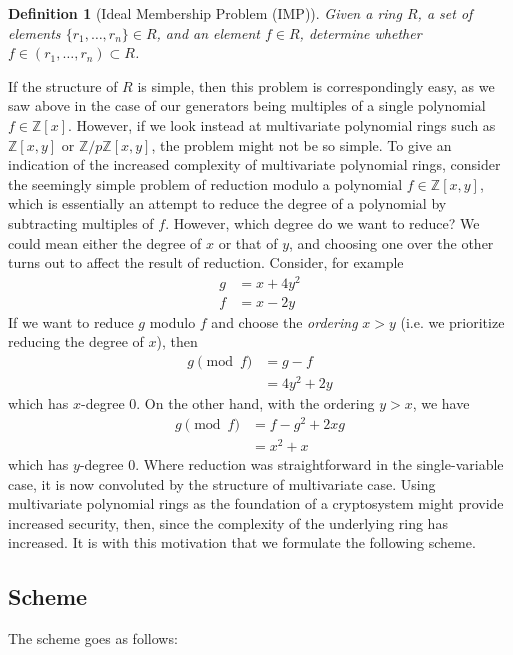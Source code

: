 \documentclass[11pt]{report}
\newtheorem{definition}{Definition}
\newcommand{\Zx}{\mathbb{Z}[x]}
\newcommand{\Zxy}{\mathbb{Z}[x,y]}
\newcommand{\Zpxy}{\mathbb{Z}/p\mathbb{Z}[x,y]}
\begin{document}
\begin{definition}[Ideal Membership Problem (IMP)]
Given a ring $R$, a set of elements $\{r_1,\dots,r_n\}\in R$, and an element $f\in R$, determine whether $f\in (r_1,\dots,r_n) \subset R$.
\end{definition}

If the structure of $R$ is simple, then this problem is correspondingly easy, as we saw above in the case of our generators being multiples of a single polynomial $f\in \Zx$. However, if we look instead at multivariate polynomial rings such as $\Zxy$ or $\Zpxy$, the problem might not be so simple. To give an indication of the increased complexity of multivariate polynomial rings, consider the seemingly simple problem of reduction modulo a polynomial $f\in \Zxy$, which is essentially an attempt to reduce the degree of a polynomial by subtracting multiples of $f$. However, which degree do we want to reduce? We could mean either the degree of $x$ or that of $y$, and choosing one over the other turns out to affect the result of reduction. Consider, for example
\begin{align*}
g &= x+4y^2\\
f &= x-2y
\end{align*}
If we want to reduce $g$ modulo $f$ and choose the \emph{ordering} $x>y$ (i.e. we prioritize reducing the degree of $x$), then
\begin{align*}
g\pmod{f} &= g-f\\
&= 4y^2+2y
\end{align*}
which has $x$-degree $0$. On the other hand, with the ordering $y>x$, we have
\begin{align*}
g\pmod{f} &= f-g^2+2xg\\
&= x^2+x
\end{align*}
which has $y$-degree $0$. Where reduction was straightforward in the single-variable case, it is now convoluted by the structure of multivariate case. Using multivariate polynomial rings as the foundation of a cryptosystem might provide increased security, then, since the complexity of the underlying ring has increased. It is with this motivation that we formulate the following scheme.

\subsection{Scheme}
\label{sec:mv_scheme}

The scheme goes as follows:
\end{document}
